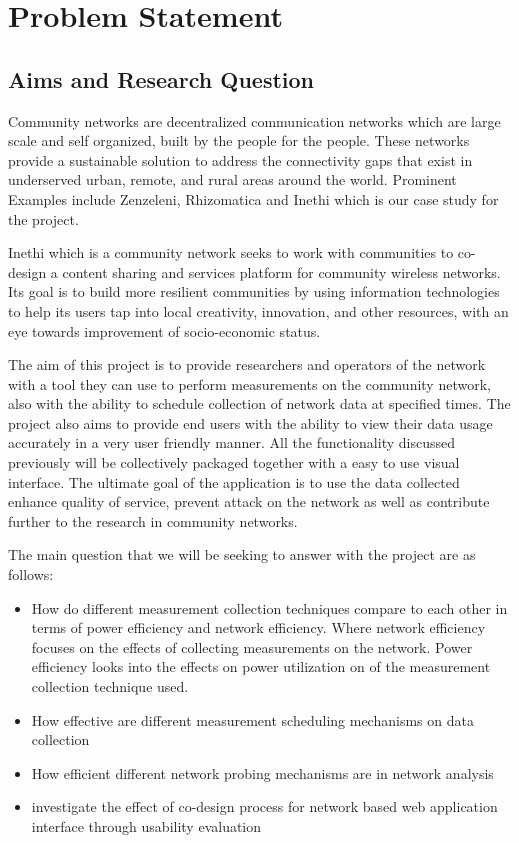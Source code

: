 \section{Problem Statement}
\subsection{Aims and Research Question}
Community networks are decentralized communication networks which are large scale and self organized, built by the people for the people\cite{Braem:2013:CRC:2500098.2500108}. These networks provide a sustainable solution to address the connectivity gaps that exist in underserved urban, remote, and rural areas around the world\cite{Braem:2015:AEQ:2830629.2830639}. Prominent Examples include Zenzeleni, Rhizomatica and Inethi which is our case study for the project.  

Inethi which is a community network seeks to work with communities to co-design a content sharing and services platform for community wireless networks\cite{inethi}. Its goal is to build more resilient communities by using information technologies to help its users tap into local creativity, innovation, and other resources, with an eye towards improvement of socio-economic status\cite{inethi}.

The aim of this project is to provide researchers and operators of the network with a tool they can use to perform measurements on the community network, also with the ability to schedule collection of network data at specified times. The project also aims to provide end users with the ability to view their data usage accurately in a very user friendly manner. All the functionality discussed previously will be collectively packaged together with a easy to use visual interface. The ultimate goal of the application is to use the data collected enhance quality of service, prevent attack on the network as well as contribute further to the research in community networks.

The main question that we will be seeking to answer with the project are as follows:
\begin{itemize}
	\item How do different measurement collection techniques compare to each other in terms of power efficiency and network efficiency. Where network efficiency focuses on the effects of collecting measurements on the network. Power efficiency looks into the effects on power utilization on of the measurement collection technique used.
	\item How effective are different measurement scheduling mechanisms on data collection 
	\item How efficient different network probing mechanisms are in network analysis 
    \item investigate the effect of co-design process for network based web application interface through usability evaluation
\end{itemize}

